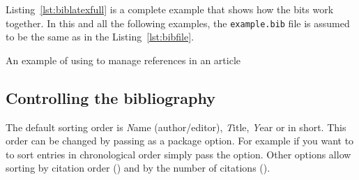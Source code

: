 Listing~\ref{lst:biblatexfull} is a complete example that shows how the bits
work together. In this and all the following examples, the \texttt{example.bib}
file is assumed to be the same as in the Listing~\ref{lst:bibfile}.
\begin{listing}
  \caption{An example of using  to manage references in
    an article}\label{lst:biblatexfull}
\end{listing}

\subsection{Controlling the bibliography}

The default sorting order is \emph{N}ame (author\slash{}editor), \emph{T}itle,
\emph{Y}ear or  in short. This order can be changed by passing
 as a package option. For example if you want to to sort
entries in chronological order simply pass the  option. Other options
allow sorting by citation order () and by the number of citations
().
\begin{example}[standalone,
  biber,
  paperwidth=6.5cm,
  paperheight=5.5cm,
]
\usepackage[
  sorting=ynt
]{biblatex}

\sloppy



\nocite{*}
\printbibliography[heading=none]

\end{example}

